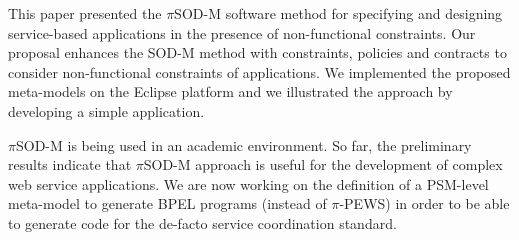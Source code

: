 This paper presented the $\pi$SOD-M software method for specifying and designing service-based applications in the presence of  non-functional constraints. 
Our proposal enhances the SOD-M method with constraints, policies and contracts  to consider non-functional constraints of applications.
We implemented the proposed meta-models on the Eclipse platform and we illustrated the approach by developing a simple application.

$\pi$SOD-M is being used in an academic environment.
So far, the preliminary results indicate that $\pi$SOD-M approach is useful for the development of complex web service applications. 
We are now working on the definition of a PSM-level meta-model to generate BPEL programs (instead of $\pi$-PEWS) in order to be able to generate code for the de-facto service coordination standard. 
